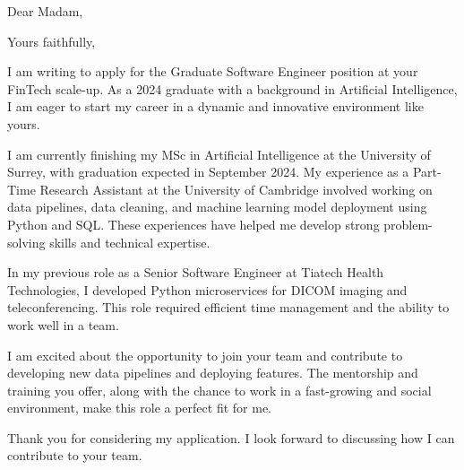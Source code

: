 \date{June 26, 2024}
\opening{Dear Madam,}
\closing{Yours faithfully,}
\makelettertitle

I am writing to apply for the Graduate Software Engineer position at your FinTech scale-up. As a 2024 graduate with a background in Artificial Intelligence, I am eager to start my career in a dynamic and innovative environment like yours.

I am currently finishing my MSc in Artificial Intelligence at the University of Surrey, with graduation expected in September 2024. My experience as a Part-Time Research Assistant at the University of Cambridge involved working on data pipelines, data cleaning, and machine learning model deployment using Python and SQL. These experiences have helped me develop strong problem-solving skills and technical expertise.

In my previous role as a Senior Software Engineer at Tiatech Health Technologies, I developed Python microservices for DICOM imaging and teleconferencing. This role required efficient time management and the ability to work well in a team.

I am excited about the opportunity to join your team and contribute to developing new data pipelines and deploying features. The mentorship and training you offer, along with the chance to work in a fast-growing and social environment, make this role a perfect fit for me.

Thank you for considering my application. I look forward to discussing how I can contribute to your team.

\makeletterclosing
